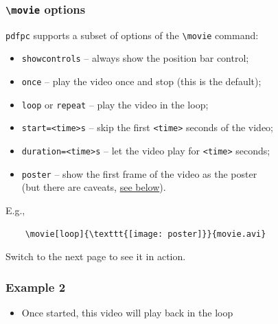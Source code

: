 \documentclass{beamer}
\newcommand{\singleitem}[1]{\begin{itemize}\item #1\end{itemize}}
\newcommand{\pdfpc}{\texttt{pdfpc}\xspace}
\newcommand{\opt}[1]{\texttt{#1}\xspace}
\begin{document}
\begin{frame}[fragile]
  \frametitle{\opt{\textbackslash movie} options}
  
  \pdfpc supports a subset of options of the \opt{\textbackslash movie} command:

  \begin{itemize}
    \item \opt{showcontrols} -- always show the position bar control;
    \item \opt{once} -- play the video once and stop (this is the default);
    \item \opt{loop} or \opt{repeat} -- play the video in the loop;
    \item \opt{start=<time>s} -- skip the first \opt{<time>} seconds of the
           video;
    \item \opt{duration=<time>s} -- let the video play for \opt{<time>} seconds;
    \item \opt{poster} -- show the first frame of the video as the poster\\
           (\alert{but there are caveats}, \hyperlink{posterPage}{see below}).
  \end{itemize}
    
  \vfill

  E.g., 
  \begin{lstlisting}
    \movie[loop]{\texttt{[image: poster]}}{movie.avi}
  \end{lstlisting}

  \vfill
  Switch to the next page to see it in action.
\end{frame}

\begin{frame}
  \frametitle{Example 2}

  \vspace{10pt}
  \begin{center}
  \end{center}

  \singleitem{Once started, this video will play back in the loop}
\end{frame}
\end{document}
